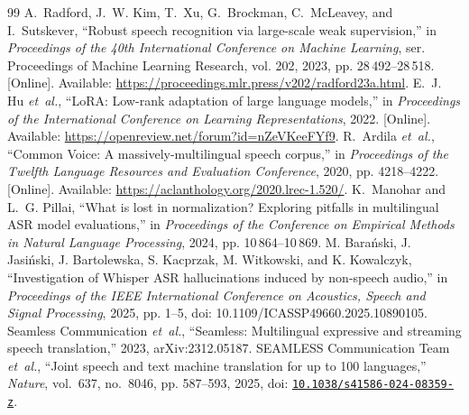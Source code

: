 \begin{thebibliography}{99}
A.~Radford, J.~W. Kim, T.~Xu, G.~Brockman, C.~McLeavey, and I.~Sutskever, ``{Robust speech recognition via large-scale weak supervision},'' in \emph{Proceedings of the 40th International Conference on Machine Learning}, ser. Proceedings of Machine Learning Research, vol. 202, 2023, pp. 28\,492--28\,518. [Online]. Available: \url{https://proceedings.mlr.press/v202/radford23a.html}.
\BIBentrySTDinterwordspacing
{}
\BIBentryALTinterwordspacing
E.~J. Hu \emph{et~al.}, ``{LoRA: Low-rank adaptation of large language models},'' in \emph{Proceedings of the International Conference on Learning Representations}, 2022. [Online]. Available: \url{https://openreview.net/forum?id=nZeVKeeFYf9}.
\BIBentrySTDinterwordspacing
{}
R.~Ardila \emph{et~al.}, ``Common Voice: A massively-multilingual speech corpus,'' in \emph{Proceedings of the Twelfth Language Resources and Evaluation Conference}, 2020, pp. 4218--4222. [Online]. Available: \url{https://aclanthology.org/2020.lrec-1.520/}.
K.~Manohar and L.~G. Pillai, ``{What is lost in normalization? Exploring pitfalls in multilingual ASR model evaluations},'' in \emph{Proceedings of the Conference on Empirical Methods in Natural Language Processing}, 2024, pp. 10\,864--10\,869.
 M. Bara\'nski, J. Jasi\'nski, J. Bartolewska, S. Kacprzak, M. Witkowski, and K. Kowalczyk, ``Investigation of Whisper ASR hallucinations induced by non-speech audio,'' in \textit{Proceedings of the IEEE International Conference on Acoustics, Speech and Signal Processing}, 2025, pp. 1--5, doi: 10.1109/ICASSP49660.2025.10890105.
\BIBentryALTinterwordspacing
{Seamless Communication} \emph{et~al.}, ``{Seamless: Multilingual expressive and streaming speech translation},'' 2023, arXiv:2312.05187.
\BIBentrySTDinterwordspacing
{}
{SEAMLESS Communication Team} \emph{et~al.}, ``Joint speech and text machine translation for up to 100 languages,'' \emph{Nature}, vol.~637, no.~8046, pp. 587--593, 2025, doi: \href{https://doi.org/10.1038/s41586-024-08359-z}{\nolinkurl{10.1038/s41586-024-08359-z}}.
\end{thebibliography}
